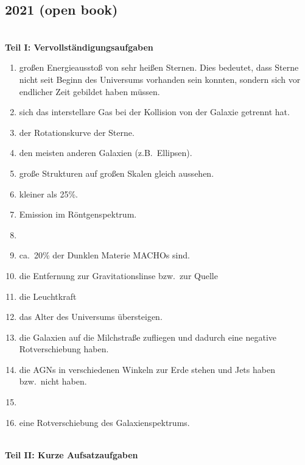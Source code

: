 \documentclass[a4paper,12pt]{article}
\numberwithin{equation}{section}
\begin{document}
\subsection{2021 (open book)}
\hfill\\\textbf{Teil I: Vervollständigungsaufgaben} 
\begin{enumerate}[label=\arabic*.]
        \item großen Energieausstoß von sehr heißen Sternen. Dies bedeutet, dass Sterne nicht seit Beginn des Universums vorhanden sein konnten, sondern sich vor endlicher Zeit gebildet haben müssen.
        \item sich das interstellare Gas bei der Kollision von der Galaxie getrennt hat.
        \item der Rotationskurve der Sterne.
        \item den meisten anderen Galaxien (z.B.\ Ellipsen).
        \item große Strukturen auf großen Skalen gleich aussehen.
        \item kleiner als 25\%.
        \item Emission im Röntgenspektrum.
        \item 
        \item ca.\ 20\% der Dunklen Materie MACHOs sind.
        \item die Entfernung zur Gravitationslinse bzw.\ zur Quelle
        \item die Leuchtkraft
        \item das Alter des Universums übersteigen.
        \item die Galaxien auf die Milchstraße zufliegen und dadurch eine negative Rotverschiebung haben.
        \item die AGNs in verschiedenen Winkeln zur Erde stehen und Jets haben bzw.\ nicht haben.
        \item 
        \item eine Rotverschiebung des Galaxienspektrums.
\end{enumerate}
\hfill\\\textbf{Teil II: Kurze Aufsatzaufgaben}
\end{document}
